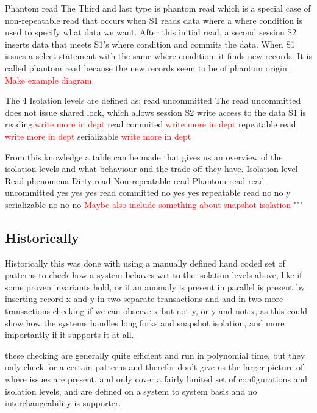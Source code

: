 \documentclass[
  a4paper,  %
  twoside,  %
  bibliography=totoc,
  headsepline,
  cleardoublepage=empty,
  parskip=half,
  draft=false
]{scrbook}
\begin{document}
Phantom read
The Third and last type is phantom read which is a special case of non-repeatable read that occurs when S1 reads data where a where condition is used to specify what data we want. After this initial read, a second session S2 inserts data that meets S1's where condition and commits the data. When S1 issues a select statement with the same where condition, it finds new records. It is called phantom read because the new records seem to be of phantom origin.
 \textcolor{red}{Make example diagram} 

The 4 Isolation levels are defined as:
read uncommitted
       The read uncommitted does not issue shared lock, which allows session S2 write access to the data S1 is reading.\textcolor{red}{write more in dept} 
 read commited
 \textcolor{red}{write more in dept} 
repeatable read
\textcolor{red}{write more in dept} 
serializable
\textcolor{red}{write more in dept} 



From this knowledge a table can be made that gives us an overview of the isolation levels and what behaviour and the trade off they have.
Isolation level	Read phenomena
Dirty read	Non-repeatable read	Phantom read
read uncommitted	yes	yes	yes
read committed	no	yes	yes
repeatable read	no	no	y
serializable	no	no	no
\textcolor{red}{Maybe also include something about snapshot isolation} 
"""

\subsection{Historically}

Historically this was done with using a manually defined hand coded set of patterns to check how a system behaves wrt to the isolation levels above, like if some proven invariants hold, or if an anomaly is present in parallel is present by inserting record x and y in two separate transactions and and in two more transactions checking if we can observe x but not y, or y and not x, as this could show how the systems handles long forks and snapshot isolation, and more importantly if it supports it at all.

these checking are generally quite efficient and run in polynomial time, but they only check for a certain patterns and therefor don't give us the larger picture of where issues are present, and only cover a fairly limited set of configurations and isolation levels, and are defined on a system to system basis and no interchangeability is supporter.
\end{document}
